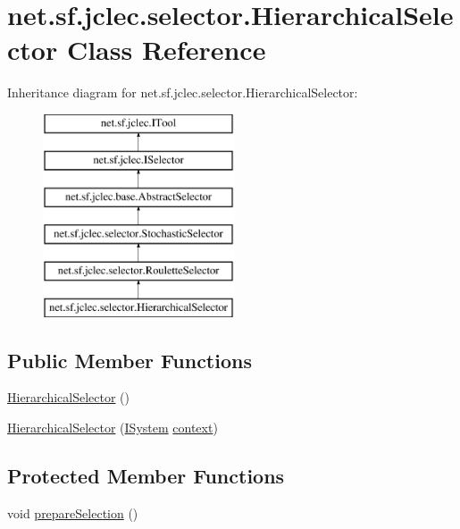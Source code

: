 \hypertarget{classnet_1_1sf_1_1jclec_1_1selector_1_1_hierarchical_selector}{\section{net.\-sf.\-jclec.\-selector.\-Hierarchical\-Selector Class Reference}
\label{classnet_1_1sf_1_1jclec_1_1selector_1_1_hierarchical_selector}
}
Inheritance diagram for net.\-sf.\-jclec.\-selector.\-Hierarchical\-Selector\-:\begin{figure}[H]
\begin{center}
\leavevmode
\includegraphics[height=6.000000cm]{classnet_1_1sf_1_1jclec_1_1selector_1_1_hierarchical_selector}
\end{center}
\end{figure}
\subsection*{Public Member Functions}
\begin{DoxyCompactItemize}
\item 
\hyperlink{classnet_1_1sf_1_1jclec_1_1selector_1_1_hierarchical_selector_a35a0ac8b26598b94c17592ba9c163af9}{Hierarchical\-Selector} ()
\item 
\hyperlink{classnet_1_1sf_1_1jclec_1_1selector_1_1_hierarchical_selector_a8494b2a56a42e102f105a95f23191a96}{Hierarchical\-Selector} (\hyperlink{interfacenet_1_1sf_1_1jclec_1_1_i_system}{I\-System} \hyperlink{classnet_1_1sf_1_1jclec_1_1base_1_1_abstract_selector_a4304fe5c27aa7631dc91678d22473b94}{context})
\end{DoxyCompactItemize}
\subsection*{Protected Member Functions}
\begin{DoxyCompactItemize}
\item 
void \hyperlink{classnet_1_1sf_1_1jclec_1_1selector_1_1_hierarchical_selector_a9365e41d27d09e4839866388cd3bbe3a}{prepare\-Selection} ()
\end{DoxyCompactItemize}
